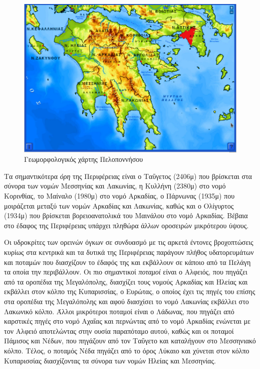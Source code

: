 \documentclass[12pt]{article}
\begin{document}
	\begin{figure} [H]
		\begin{center}
			\includegraphics [scale = 0.60] {peloponnisos.png}
		\end{center}
	\caption{Γεωμορφολογικός χάρτης Πελοποννήσου}
	\label{peloponnese}
	\end{figure}

	Τα σημαντικότερα \emph{όρη} της Περιφέρειας είναι ο Ταΰγετος (2406μ) που βρίσκεται στα σύνορα των νομών Μεσσηνίας και Λακωνίας, η Κυλλήνη (2380μ) στο νομό Κορινθίας, το Μαίναλο (1980μ) στο νομό Αρκαδίας, ο Πάρνωνας (1935μ) που μοιράζεται μεταξύ των νομών Αρκαδίας και Λακωνίας, καθώς και ο Ολίγυρτος (1934μ) που βρίσκεται βορειοανατολικά του Μαινάλου στο νομό Αρκαδίας. Βέβαια στο έδαφος της Περιφέρειας υπάρχει πληθώρα άλλων οροσειρών μικρότερου ύψους.
	
	Οι υδροκρίτες των ορεινών όγκων σε συνδυασμό με τις αρκετά έντονες βροχοπτώσεις κυρίως στα κεντρικά και τα δυτικά της Περιφέρειας παράγουν πλήθος υδατορευμάτων και ποταμών που διασχίζουν το έδαφός της και εκβάλλουν σε κάποιο από τα Πελάγη τα οποία την περιβάλλουν. Οι πιο σημαντικοί \emph{ποταμοί} είναι ο Αλφειός, που πηγάζει από τα οροπέδια της Μεγαλόπολης, διασχίζει τους νομούς Αρκαδίας και Ηλείας και εκβάλλει στον κόλπο της Κυπαρισσίας, ο Ευρώτας, ο οποίος έχει τις πηγές του επίσης στα οροπέδια της Μεγαλόπολης και αφού διασχίσει το νομό Λακωνίας εκβάλλει στο Λακωνικό κόλπο. Άλλοι μικρότεροι ποταμοί είναι ο Λάδωνας, που πηγάζει από καρστικές πηγές στο νομό Αχαΐας και περνώντας από το νομό Αρκαδίας ενώνεται με τον Αλφειό αποτελώντας στην ουσία παραπόταμο αυτού, καθώς και οι ποταμοί Πάμισος και Νέδων, που πηγάζουν από τον Ταΰγετο και καταλήγουν στο Μεσσηνιακό κόλπο. Τέλος, ο ποταμός Νέδα πηγάζει από το όρος Λύκαιο και χύνεται στον κόλπο Κυπαρισσίας διασχίζοντας τα σύνορα των νομών Ηλείας και Μεσσηνίας.  
	
\end{document}
